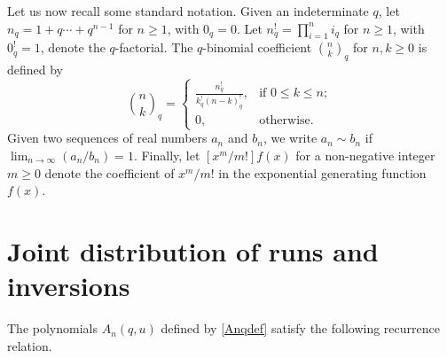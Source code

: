 \documentclass[11pt,a4paper]{article}
\begin{document}
Let us now recall some standard notation.  Given an indeterminate $q$, let $n_q=1+q\cdots+q^{n-1}$ for $n \geq 1$, with $0_q=0$.  Let $n_q^!=\prod_{i=1}^n i_q$ for $n \geq 1$, with $0_q^!=1$, denote the $q$-factorial.  The $q$-binomial coefficient $\binom{n}{k}_q$ for $n,k \geq0$ is defined by
\[
 \binom{n}{k}_q =
\begin{cases}
    \frac{n_q^!}{k_q^!(n-k)_q^!},   & \text{if } 0 \leq k \leq n; \\
    0,    & \text{otherwise}.
\end{cases}
\]
Given two sequences of real numbers $a_n$ and $b_n$, we write $a_n \sim b_n$ if $\lim_{n \rightarrow \infty}(a_n/b_n)=1$.  Finally, let $[x^m/m!]f(x)$ for a non-negative integer $m \geq0$ denote the coefficient of $x^m/m!$ in the exponential generating function $f(x)$.


\section{Joint distribution of runs and inversions}


The polynomials $A_n(q,u)$ defined by \eqref{Anqdef} satisfy the following recurrence relation.
\end{document}

